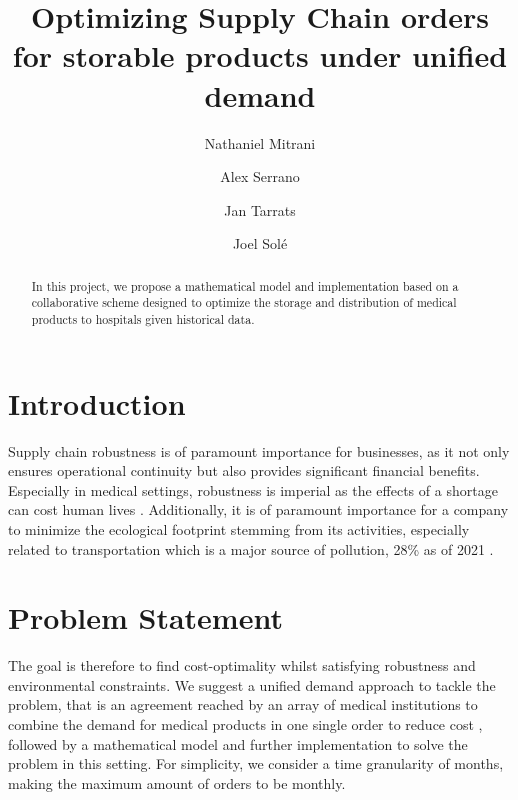 \documentclass[11pt,twocolumn]{article}
\begin{document}
\title{Optimizing Supply Chain orders for storable products under unified demand}

\author{Nathaniel Mitrani \\ \and Alex Serrano \\  \and Jan Tarrats \\ \and Joel Solé}

\maketitle

\begin{abstract}
	In this project, we propose a mathematical model and implementation based on a collaborative scheme designed to optimize the storage and distribution of medical products to hospitals given historical data.
\end{abstract}


\section{Introduction}\label{sec1}
Supply chain robustness is of paramount importance for businesses, as it not only ensures operational continuity but also provides significant financial benefits. Especially in medical settings, robustness is imperial as the effects of a shortage can cost human lives \cite{key3}.
Additionally, it is of paramount importance for a company to minimize the ecological footprint stemming from its activities, especially related to transportation which is a major source of pollution, 28\% as of 2021 \cite{key1}.

\section{Problem Statement}\label{sec2}
The goal is therefore to find cost-optimality whilst satisfying robustness and environmental constraints. We suggest a unified demand approach to tackle the problem, that is an agreement reached by an array of medical institutions to combine the demand for medical products in one single order to reduce cost \cite{key2}, followed by a mathematical model and further implementation to solve the problem in this setting. For simplicity, we consider a time granularity of months, making the maximum amount of orders to be monthly.
\end{document}
